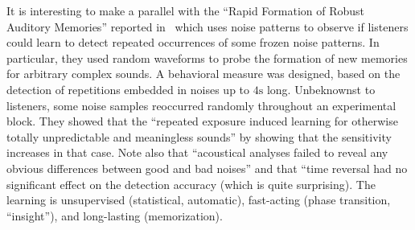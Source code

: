 \documentclass[brainsci, %
               review,submit,pdftex,moreauthors
               ]{Definitions/mdpi}
\begin{document}
It is interesting to make a parallel with the ``Rapid Formation of Robust Auditory Memories'' reported in~\citep{agus_rapid_2010} which uses noise patterns to observe if listeners could learn to detect repeated occurrences of some frozen noise patterns. In particular, they used random waveforms to probe the formation of new memories for arbitrary complex sounds. A behavioral measure was designed, based on the detection of repetitions embedded in noises up to $4 \si{\second}$ long. %
Unbeknownst to listeners, some noise samples reoccurred randomly throughout an experimental block. They showed that the ``repeated exposure induced learning for otherwise totally unpredictable and meaningless sounds'' by showing that the sensitivity increases in that case. Note also that ``acoustical analyses failed to reveal any obvious differences between good and bad noises'' and that ``time reversal had no significant effect on the detection accuracy (which is quite surprising). The learning is unsupervised (statistical, automatic), fast-acting (phase transition, ``insight''), and long-lasting (memorization). 
\end{document}
